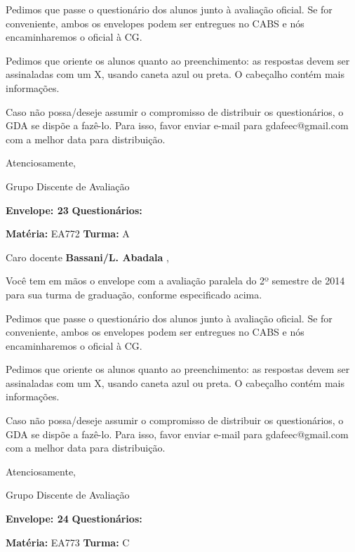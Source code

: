 \documentclass[a5paper]{letter}
\begin{document}
	Pedimos que passe o questionário dos alunos junto à avaliação oficial. Se for conveniente, ambos os envelopes podem ser entregues no CABS e nós encaminharemos o oficial à CG.

Pedimos que oriente os alunos quanto ao preenchimento: as respostas devem ser assinaladas com um X, usando caneta azul ou preta. O cabeçalho contém mais informações.

	Caso não possa/deseje assumir o compromisso de distribuir os questionários, o GDA se dispõe a fazê-lo. Para isso, favor enviar e-mail para gdafeec@gmail.com com a melhor data para distribuição.


Atenciosamente, 

Grupo Discente de Avaliação

\vspace{0.5cm}

{\bf Envelope: 23 }		\hfill	{\bf Questionários:} \hspace{2cm}

\newpage
\thispagestyle{empty}

\hfill {\bf Matéria:} EA772 {\bf Turma:} A

Caro docente {\bf Bassani/L. Abadala }, 

	Você tem em mãos o envelope com a avaliação paralela do 2º semestre de 2014 para sua turma de graduação, conforme especificado acima.

	Pedimos que passe o questionário dos alunos junto à avaliação oficial. Se for conveniente, ambos os envelopes podem ser entregues no CABS e nós encaminharemos o oficial à CG.

Pedimos que oriente os alunos quanto ao preenchimento: as respostas devem ser assinaladas com um X, usando caneta azul ou preta. O cabeçalho contém mais informações.

	Caso não possa/deseje assumir o compromisso de distribuir os questionários, o GDA se dispõe a fazê-lo. Para isso, favor enviar e-mail para gdafeec@gmail.com com a melhor data para distribuição.


Atenciosamente, 

Grupo Discente de Avaliação

\vspace{0.5cm}

{\bf Envelope: 24 }		\hfill	{\bf Questionários:} \hspace{2cm}

\newpage
\thispagestyle{empty}

\hfill {\bf Matéria:} EA773 {\bf Turma:} C
\end{document}
